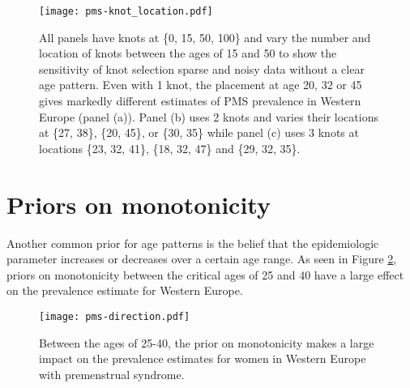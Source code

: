    \begin{figure}
        \begin{center}
            \texttt{[image: pms-knot\_location.pdf]}
        \end{center}
        \caption{All panels have knots at \{0, 15, 50, 100\} and vary
          the number and location of knots between the ages of 15 and
          50 to show the sensitivity of knot selection sparse and
          noisy data without a clear age pattern. Even with 1 knot,
          the placement at age 20, 32 or 45 gives markedly different
          estimates of PMS prevalence in Western Europe (panel (a)).
          Panel (b) uses 2 knots and varies their locations at \{27,
          38\}, \{20, 45\}, or \{30, 35\} while panel (c) uses 3 knots
          at locations \{23, 32, 41\}, \{18, 32, 47\} and \{29, 32,
          35\}.}
        \label{fig:app-knot_loc}
    \end{figure}

\section{Priors on monotonicity}
Another common prior for age patterns is the belief that the
epidemiologic parameter increases or decreases over a certain age
range.  As seen in Figure \ref{fig:app-knot_loc}, priors on
monotonicity between the critical ages of 25 and 40 have a large
effect on the prevalence estimate for Western Europe.

    \begin{figure}
        \begin{center}
            \texttt{[image: pms-direction.pdf]}
        \end{center}
        \caption{Between the ages of 25-40, the prior on monotonicity
          makes a large impact on the prevalence estimates for women
          in Western Europe with premenstrual syndrome.}
        \label{fig:app-knot_loc}
    \end{figure} 
